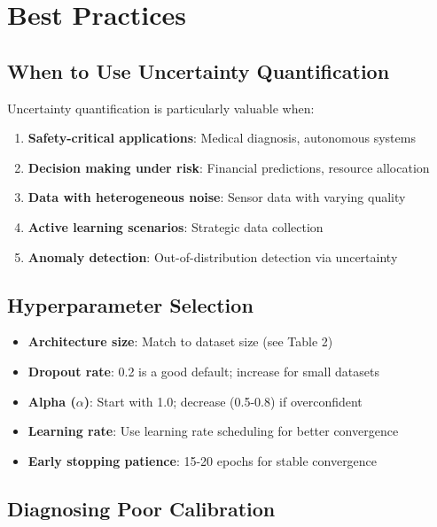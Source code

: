 \documentclass[11pt,a4paper]{article}
\begin{document}
\section{Best Practices}

\subsection{When to Use Uncertainty Quantification}

Uncertainty quantification is particularly valuable when:
\begin{enumerate}
    \item \textbf{Safety-critical applications}: Medical diagnosis, autonomous systems
    \item \textbf{Decision making under risk}: Financial predictions, resource allocation
    \item \textbf{Data with heterogeneous noise}: Sensor data with varying quality
    \item \textbf{Active learning scenarios}: Strategic data collection
    \item \textbf{Anomaly detection}: Out-of-distribution detection via uncertainty
\end{enumerate}

\subsection{Hyperparameter Selection}

\begin{itemize}
    \item \textbf{Architecture size}: Match to dataset size (see Table 2)
    \item \textbf{Dropout rate}: 0.2 is a good default; increase for small datasets
    \item \textbf{Alpha ($\alpha$)}: Start with 1.0; decrease (0.5-0.8) if overconfident
    \item \textbf{Learning rate}: Use learning rate scheduling for better convergence
    \item \textbf{Early stopping patience}: 15-20 epochs for stable convergence
\end{itemize}

\subsection{Diagnosing Poor Calibration}
\end{document}
